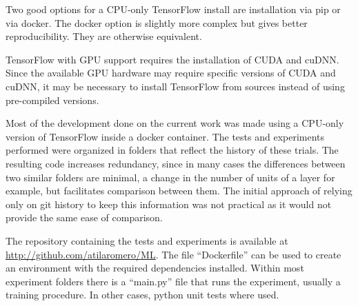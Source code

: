 Two good options for a CPU-only TensorFlow install are installation via pip or via docker. The docker option is slightly more complex but gives better reproducibility. They are otherwise equivalent.

TensorFlow with GPU support requires the installation of CUDA and cuDNN. Since the available GPU hardware may require specific versions of CUDA and cuDNN, it may be necessary to install TensorFlow from sources instead of using pre-compiled versions.

Most of the development done on the current work was made using a CPU-only version of TensorFlow inside a docker container. The tests and experiments performed were organized in folders that reflect the history of these trials. The resulting code increases redundancy, since in many cases the differences between two similar folders are minimal, a change in the number of units of a layer for example, but facilitates comparison between them. The initial approach of relying only on git history to keep this information was not practical as it would not provide the same ease of comparison.

The repository containing the tests and experiments is available at \url{http://github.com/atilaromero/ML}. The file ``Dockerfile'' can be used to create an environment with the required dependencies installed. Within most experiment folders there is a ``main.py'' file that runs the experiment, usually a training procedure. In other cases, python unit tests where used.
